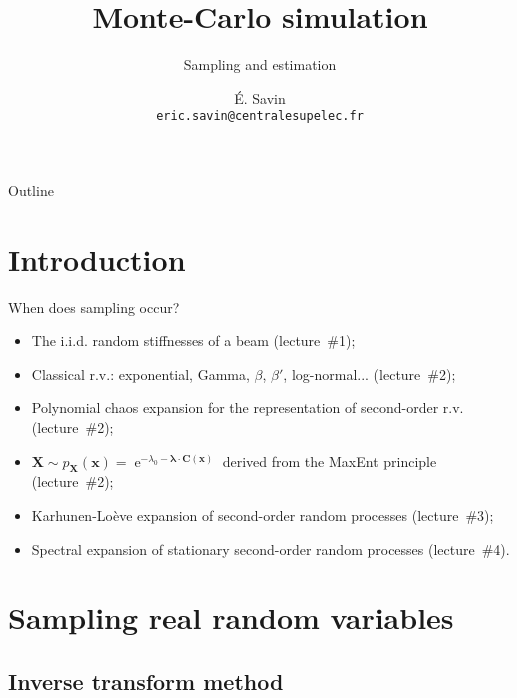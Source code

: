 \documentclass{beamer}
\title[MC simulation]
{Monte-Carlo simulation}
\subtitle
{Sampling and estimation} %
\author[\'E. Savin] %
{\'E. Savin\inst{1,2}\\\scriptsize{\texttt{eric.savin@centralesupelec.fr}}}%
\institute[\Onera] %
{\inst{1}{Information Processing and Systems Dept.\\\Onera, France}
\and
 \inst{2}{Mechanical and Environmental Engineering Dept.\\\ECP, France}}%
\date{}
\newcommand{\iexp}{\operatorname{e}}
\newcommand{\xgj}{x}
\newcommand{\xg}{{\boldsymbol\xgj}}
\newcommand{\Xgj}{X}
\newcommand{\Xg}{{\boldsymbol\Xgj}}
\newcommand{\lagmuli}{\lambda}
\newcommand{\lagmul}{{\boldsymbol\lagmuli}}
\newcommand{\constraint}{{\boldsymbol C}}
\begin{document}
\begin{frame}
  \titlepage
\end{frame}

\begin{frame}{Outline}
  \tableofcontents
\end{frame}




\section{Introduction}

\begin{frame}{When does sampling occur?}{}

\begin{itemize}
\item The i.i.d. random stiffnesses of a beam (lecture~\#1);
\item Classical r.v.: exponential, Gamma, $\beta$, $\beta'$, log-normal... (lecture~\#2);
\item Polynomial chaos expansion for the representation of second-order r.v. (lecture~\#2);
\item $\Xg\sim p_\Xg(\xg)=\iexp^{-\lagmuli_0-\lagmul\cdot\constraint(\xg)}$ derived from the MaxEnt principle (lecture~\#2);
\item Karhunen-Lo\`eve expansion of second-order random processes (lecture~\#3);
\item Spectral expansion of stationary second-order random processes (lecture~\#4).
\end{itemize}

\end{frame}

\section{Sampling real random variables}

\subsection{Inverse transform method}
\end{document}

